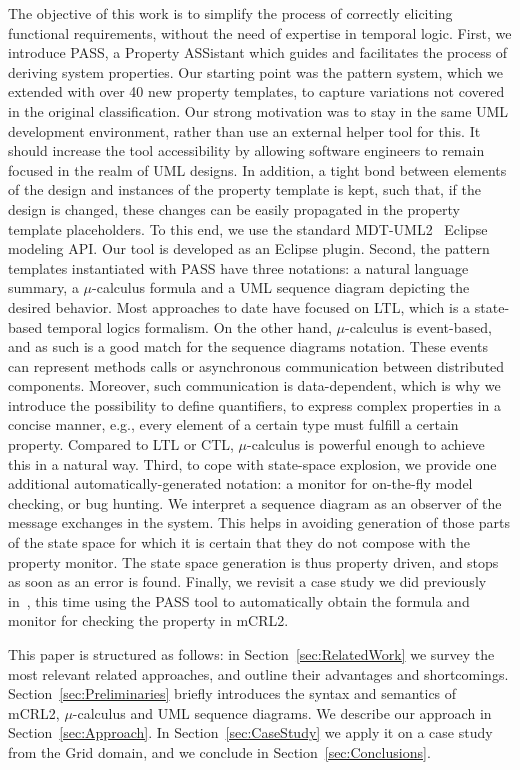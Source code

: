 \documentclass[letter]{llncs}
\begin{document}
The objective of this work is to simplify the process of correctly eliciting
functional requirements, without the need of expertise in temporal logic. 
First, we introduce PASS, a Property ASSistant which guides and facilitates the process of deriving
system properties. Our starting point was the pattern system,
which we extended with over 40 new property templates, to capture variations not covered 
in the original classification. Our strong motivation was to stay
in the same UML development environment, rather than use an external helper tool for this.
It should increase the tool accessibility by allowing software engineers to remain focused in the realm of UML designs.
In addition, a tight bond between elements of the design and instances of the property template is kept, such that, if the 
design is changed, these changes can be easily propagated in the property template placeholders. 
To this end, we use the standard MDT-UML2~\cite{MDTUML2} Eclipse modeling API. Our tool is developed as an Eclipse plugin.
Second, the pattern templates instantiated with PASS have three notations: a natural language summary, a $\mu$-calculus formula
and a UML sequence diagram depicting the desired behavior. Most approaches to date 
have focused on LTL, which is a state-based temporal logics formalism. On the other hand,
 $\mu$-calculus is event-based, and as such is a good match for the sequence diagrams notation. 
These events can represent methods calls or asynchronous communication between distributed components.
Moreover, such communication is data-dependent, which is why we introduce
the possibility to define quantifiers, to express complex properties in a concise manner, e.g., every
element of a certain type must fulfill a certain property. 
Compared to LTL or CTL,  $\mu$-calculus is powerful enough
to achieve this in a natural way. Third, to cope with state-space explosion,
we provide one additional automatically-generated notation: a monitor for on-the-fly model checking, or bug hunting.
We interpret a sequence diagram as an observer of the message exchanges in the system.
This helps in avoiding generation of those parts of the state space for which it is 
certain that they do not compose with the property monitor. The state space
generation is thus property driven, and stops as soon as an error is found.
Finally, we revisit a case study we did previously in~\cite{DBLP:dblp_conf/nfm/RemenskaTWHVCB13}, this time
using the PASS tool to automatically obtain the formula and monitor for checking the property in mCRL2.

This paper is structured as follows: in Section~\ref{sec:RelatedWork} we
 survey the most relevant related approaches,
and outline their advantages and shortcomings. Section~\ref{sec:Preliminaries} briefly introduces the
syntax and semantics of mCRL2, $\mu$-calculus and UML sequence diagrams.
We describe our approach in Section~\ref{sec:Approach}.
In Section~\ref{sec:CaseStudy} we apply it on a case study from the Grid domain, and we conclude in Section~\ref{sec:Conclusions}.
\end{document}
